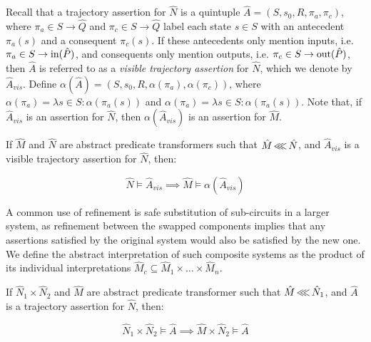 Recall that a trajectory assertion for $\hat N$ is a quintuple $\hat A = (S, s_{0}, R, \pi_{a}, \pi_{c})$, where $\pi_{a} \in S \rightarrow \hat Q$ and $\pi_{c} \in S \rightarrow \hat Q$ label each state $s \in S$ with an antecedent $\pi_{a}(s)$ and a consequent $\pi_{c}(s)$. If these antecedents only mention inputs, i.e. $\pi_{a} \in S \rightarrow \operatorname{in}(\hat P)$, and consequents only mention outputs, i.e. $\pi_{c} \in S \rightarrow \operatorname{out}(\hat P)$, then $\hat A$ is referred to as a \textit{visible trajectory assertion} for $\hat N$, which we denote by $\hat A_{vis}$. Define $\alpha(\hat A) = (S, s_{0}, R, \alpha(\pi_{a}), \alpha(\pi_{c}))$, where $\alpha(\pi_{a}) = \lambda s \in S : \alpha(\pi_{a}(s))$ and $\alpha(\pi_{a}) = \lambda s \in S : \alpha(\pi_{a}(s))$. Note that, if $\hat A_{vis}$ is an assertion for $\hat N$, then $\alpha(\hat A_{vis})$ is an assertion for $\hat M$.



\begin{theorem}
\label{thm:refinement}
If $\hat M$ and $\hat N$ are abstract predicate transformers such that $\hat M \operatorname{\lll} \hat N$, and $\hat A_{vis}$ is a visible trajectory assertion for $\hat N$, then:

\begin{equation*}
\hat N \models \hat A_{vis} \implies \hat M \models \alpha(\hat A_{vis})
\end{equation*}
\end{theorem}

A common use of refinement is safe substitution of sub-circuits in a larger system, as refinement between the swapped components implies that any assertions satisfied by the original system would also be satisfied by the new one. We define the abstract interpretation of such composite systems as the product of its individual interpretations $\hat M_{c} \subseteq \hat M_{1} \times \ldots \times \hat M_{n}$.

\begin{corollary}
\label{thm:refinement-product}
If $\hat N_{1} \times \hat N_{2}$ and $\hat M$ are abstract predicate transformer such that $\hat M \operatorname{\lll} \hat N_{1}$, and $\hat A$ is a trajectory assertion for $\hat N$, then:

\begin{equation*}
\hat N_{1} \times \hat N_{2} \models \hat A \implies \hat M \times \hat N_{2} \models \hat A
\end{equation*}
\end{corollary}

